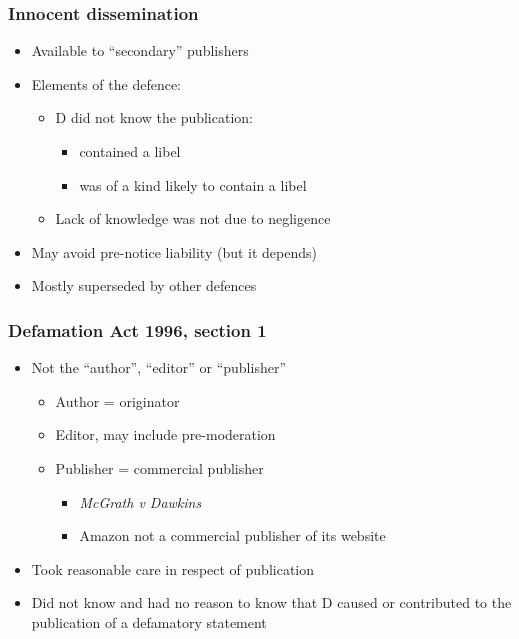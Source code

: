 \documentclass[ignorenonframetext,]{beamer}
\begin{document}
\begin{frame}
  \frametitle{Innocent dissemination}
  \begin{itemize}
  \item Available to ``secondary'' publishers
  \item Elements of the defence:
    \begin{itemize}
    \item D did not know the publication:
      \begin{itemize}
      \item contained a libel
      \item was of a kind likely to contain a libel
      \end{itemize}
    \item Lack of knowledge was not due to negligence
    \end{itemize}
  \item May avoid pre-notice liability (but it depends)
  \item Mostly superseded by other defences
  \end{itemize}
\end{frame}

\begin{frame}
\frametitle{Defamation Act 1996, section 1}

\begin{itemize}
\item Not the ``author'', ``editor'' or ``publisher''
  \begin{itemize}
  \item Author = originator
  \item Editor, may include pre-moderation
  \item Publisher = commercial publisher
    \begin{itemize}
    \item {\it McGrath v Dawkins}
    \item Amazon not a commercial publisher of its website
    \end{itemize}
  \end{itemize}
\item Took reasonable care in respect of publication
\item Did not know and had no reason to know that D caused or
  contributed to the publication of a defamatory statement
\end{itemize}

\end{frame}
\end{document}
